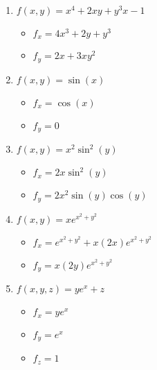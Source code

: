 \documentclass[../practica_04.tex]{subfiles}
\begin{document}
    \begin{enumerate}
        \item $f(x,y) = x^4 + 2xy + y^3x -1$
            \begin{itemize}
                \item $f_x = 4x^3 + 2y + y^3$
                \item $f_y = 2x + 3xy^2 $
            \end{itemize}
        \item $f(x,y) = \sin(x)$
            \begin{itemize}
                \item $f_x = \cos(x) $
                \item $f_y = 0 $
            \end{itemize}
        \item $f(x,y) = x^2\sin^2(y)$
            \begin{itemize}
                \item $f_x = 2x\sin^2(y) $
                \item $f_y = 2x^2\sin(y)\cos(y) $
            \end{itemize}
        \item $f(x,y) = xe^{x^2+y^2}$
            \begin{itemize}
                \item $f_x = e^{x^2+y^2} + x(2x)e^{x^2+y^2} $
                \item $f_y = x(2y)e^{x^2+y^2} $
            \end{itemize}
        \item $f(x,y,z) = ye^x+z$
            \begin{itemize}
                \item $f_x = ye^x $
                \item $f_y = e^x $
                \item $f_z = 1 $
            \end{itemize}
    \end{enumerate}
\end{document}
